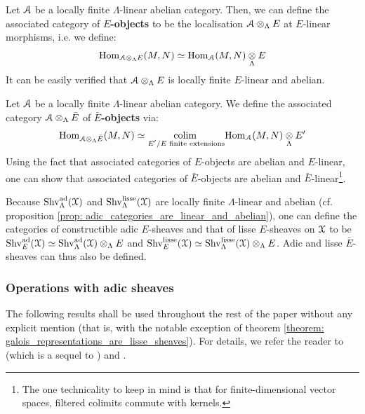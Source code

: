                 \begin{definition}[$E$-objects] \label{def: E_objects}
                    Let $\mathcal{A}$ be a locally finite $\Lambda$-linear abelian category. Then, we can define the associated category of \textbf{$E$-objects} to be the localisation $\calA \tensor_{\Lambda} E$ at $E$-linear morphisms, i.e. we define:
                        $$\Hom_{\calA \tensor_{\Lambda} E}(M, N) \cong \Hom_{\calA}(M, N) \tensor_{\Lambda} E$$
                    It can be easily verified that $\calA \tensor_{\Lambda} E$ is locally finite $E$-linear and abelian.
                \end{definition}
                \begin{definition} \label{def: bar_E_objects}
                    Let $\mathcal{A}$ be a locally finite $\Lambda$-linear abelian category. We define the associated category $\calA \tensor_{\Lambda} \bar{E}$ of \textbf{$\bar{E}$-objects} via:
                        $$\Hom_{\calA \tensor_{\Lambda} \bar{E}}(M, N) \cong \underset{\text{$E'/E$ finite extensions}}{\colim} \Hom_{\calA}(M, N) \tensor_{\Lambda} E'$$
                    Using the fact that associated categories of $E$-objects are abelian and $E$-linear, one can show that associated categories of $\bar{E}$-objects are abelian and $\bar{E}$-linear\footnote{The one technicality to keep in mind is that for finite-dimensional vector spaces, filtered colimits commute with kernels.}. 
                \end{definition}
                \begin{example} \label{example: E_sheaves}
                    Because $\mathrm{Shv}_{\Lambda}^{\mathrm{ad}}(\mathcal{X})$ and $\mathrm{Shv}_{\Lambda}^{\mathrm{lisse}}(\mathcal{X})$ are locally finite $\Lambda$-linear and abelian (cf. proposition \ref{prop: adic_categories_are_linear_and_abelian}), one can define the categories of constructible adic $E$-sheaves and that of lisse $E$-sheaves on $\mathcal{X}$ to be $\Shv_E^{\ad}(\calX) \cong \Shv_{\Lambda}^{\ad}(\calX) \tensor_{\Lambda} E$ and $\Shv_E^{\lisse}(\calX) \cong \Shv_{\Lambda}^{\lisse}(\calX) \tensor_{\Lambda} E$. Adic and lisse $\bar{E}$-sheaves can thus also be defined.
                \end{example}
                
            \subsubsection{Operations with adic sheaves}
                The following results shall be used throughout the rest of the paper without any explicit mention (that is, with the notable exception of theorem \ref{theorem: galois_representations_are_lisse_sheaves}). For details, we refer the reader to \cite[Sections 6-8]{laszlo_olsson_adic_sheaves_on_artin_stacks_2} (which is a sequel to \cite{laszlo_olsson_adic_sheaves_on_artin_stacks_1}) and \cite[Sections II.7-II.10]{kiehl_weissauer_weil_conjecture_perverse_sheaves_and_l_adic_fourier_transform}.
                

